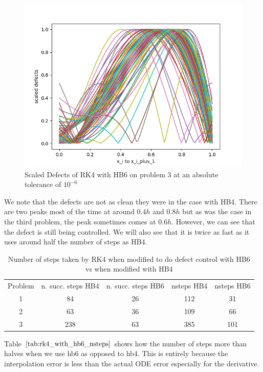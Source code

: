 \documentclass{article}
\begin{document}
\begin{figure}[H]
\centering
\includegraphics[width=0.7\linewidth]{./figures/rk4_with_hb6_p3_scaled_defects}
\caption{Scaled Defects of RK4 with HB6 on problem 3 at an absolute tolerance of $10^{-6}$}
\label{fig:rk4_with_hb6_p3_scaled_defects}
\end{figure}

We note that the defects are not as clean they were in the case with HB4. There are two peaks most of the time at around $0.4h$ and $0.8h$ but as was the case in the third problem, the peak sometimes comes at $0.6h$. However, we can see that the defect is still being controlled. We will also see that it is twice as fast as it uses around half the number of steps as HB4.

\begin{table}[h]
\caption {Number of steps taken by RK4 when modified to do defect control with HB6 vs when modified with HB4} \label{tab:rk4_with_hb6_nsteps}
\begin{center}
\begin{tabular}{ c c c c c } 
Problem & n. succ. steps HB4 & n. succ. steps HB6 & nsteps HB4  & nsteps HB6 \\ 
1       & 84                 &        26          & 112         & 31\\ 
2       & 63                 &        36          & 109         & 66\\
3       & 238                &        63          & 385         & 101\\
\end{tabular}
\end{center}
\end{table}

Table $\ref{tab:rk4_with_hb6_nsteps}$ shows how the number of steps more than halves when we use hb6 as opposed to hb4. This is entirely because the interpolation error is less than the actual ODE error especially for the derivative.
\end{document}
